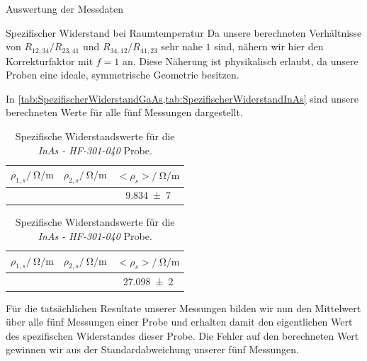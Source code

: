 \documentclass[pdftex, a4paper,11pt, twoside, ngerman]{report}
\begin{document}
\begin{chapter}{Auswertung der Messdaten}
\begin{section}{Spezifischer Widerstand bei Raumtemperatur}
      Da unsere berechneten Verhältnisse von $R_{12,34}/R_{23,41}$ und
      $R_{34,12}/R_{41,23}$ sehr nahe $1$ sind, nähern wir hier den
      Korrekturfaktor mit $f=1$ an.
      Diese Näherung ist physikalisch erlaubt, da unsere Proben eine ideale,
      symmetrische Geometrie besitzen.
      
      In \cref{tab:SpezifischerWiderstandGaAs,tab:SpezifischerWiderstandInAs}
      sind unsere berechneten Werte für alle fünf Messungen dargestellt.
      \begin{table}[htbp]
        \begin{minipage}{.48\textwidth}
          \centering
          \footnotesize
          \begin{tabular}{ccc}
            $\rho_{1,s}/\SI{}{\ohm\per\meter}$ &
            $\rho_{2,s}/\SI{}{\ohm\per\meter}$ &
            $<\rho_{s}>/\SI{}{\ohm\per\meter}$
            \\ \hline \hline
            
            \cline{3-3} \cline{3-3}
            & & \SI{9,834(7)}{} \\
          \end{tabular}
          \caption{Spezifische Widerstandswerte für die \textit{GaAs (alt)}
              Probe.}
          \label{tab:SpezifischerWiderstandGaAs}
        \end{minipage}\quad
        \begin{minipage}{.48\textwidth}
          \centering
          \footnotesize
          \begin{tabular}{ccc}
            $\rho_{1,s}/\SI{}{\ohm\per\meter}$ &
            $\rho_{2,s}/\SI{}{\ohm\per\meter}$ &
            $<\rho_{s}>/\SI{}{\ohm\per\meter}$
            \\ \hline \hline
            
            \cline{3-3} \cline{3-3}
            & & \SI{27,098(2)}{} \\
          \end{tabular}
          \caption{Spezifische Widerstandswerte für die
              \textit{InAs - HF-301-040} Probe.}
          \label{tab:SpezifischerWiderstandInAs}
        \end{minipage}
      \end{table}
      
      Für die tatsächlichen Resultate unserer Messungen bilden wir nun den
      Mittelwert über alle fünf Messungen einer Probe und erhalten damit
      den eigentlichen Wert des spezifischen Widerstandes dieser Probe.
      Die Fehler auf den berechneten Wert gewinnen wir aus der
      Standardabweichung unserer fünf Messungen.
      

\end{section}
\end{chapter}
\end{document}
